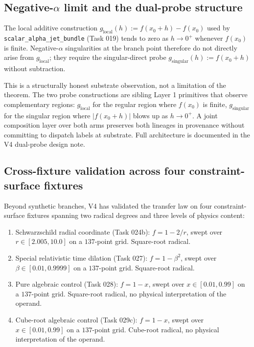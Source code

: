 \documentclass[11pt,a4paper]{article}
\begin{document}
\subsection{Negative-$\alpha$ limit and the dual-probe structure}

The local additive construction $g_{\mathrm{local}}(h) := f(x_0+h) - f(x_0)$ used by \texttt{scalar\_alpha\_jet\_bundle} (Task 019) tends to zero as $h \to 0^+$ whenever $f(x_0)$ is finite. Negative-$\alpha$ singularities at the branch point therefore do not directly arise from $g_{\mathrm{local}}$; they require the singular-direct probe $g_{\mathrm{singular}}(h) := f(x_0+h)$ without subtraction.

This is a structurally honest substrate observation, not a limitation of the theorem. The two probe constructions are sibling Layer 1 primitives that observe complementary regions: $g_{\mathrm{local}}$ for the regular region where $f(x_0)$ is finite, $g_{\mathrm{singular}}$ for the singular region where $|f(x_0+h)|$ blows up as $h \to 0^+$. A joint composition layer over both arms preserves both lineages in provenance without committing to dispatch labels at substrate. Full architecture is documented in the V4 dual-probe design note.

\subsection{Cross-fixture validation across four constraint-surface fixtures}

Beyond synthetic branches, V4 has validated the transfer law on four constraint-surface fixtures spanning two radical degrees and three levels of physics content:

\begin{enumerate}
    \item Schwarzschild radial coordinate (Task 024b): $f = 1 - 2/r$, swept over $r \in [2.005, 10.0]$ on a $137$-point grid. Square-root radical.
    \item Special relativistic time dilation (Task 027): $f = 1 - \beta^2$, swept over $\beta \in [0.01, 0.9999]$ on a $137$-point grid. Square-root radical.
    \item Pure algebraic control (Task 028): $f = 1 - x$, swept over $x \in [0.01, 0.99]$ on a $137$-point grid. Square-root radical, no physical interpretation of the operand.
    \item Cube-root algebraic control (Task 029c): $f = 1 - x$, swept over $x \in [0.01, 0.99]$ on a $137$-point grid. Cube-root radical, no physical interpretation of the operand.
\end{enumerate}
\end{document}
